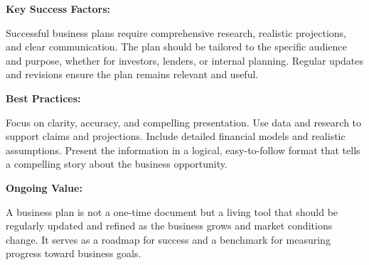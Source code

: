 \documentclass[12pt]{article}
\begin{document}
\textbf{Key Success Factors:}

Successful business plans require comprehensive research, realistic projections, and clear communication. The plan should be tailored to the specific audience and purpose, whether for investors, lenders, or internal planning. Regular updates and revisions ensure the plan remains relevant and useful.

\textbf{Best Practices:}

Focus on clarity, accuracy, and compelling presentation. Use data and research to support claims and projections. Include detailed financial models and realistic assumptions. Present the information in a logical, easy-to-follow format that tells a compelling story about the business opportunity.

\textbf{Ongoing Value:}

A business plan is not a one-time document but a living tool that should be regularly updated and refined as the business grows and market conditions change. It serves as a roadmap for success and a benchmark for measuring progress toward business goals.
\end{document}
